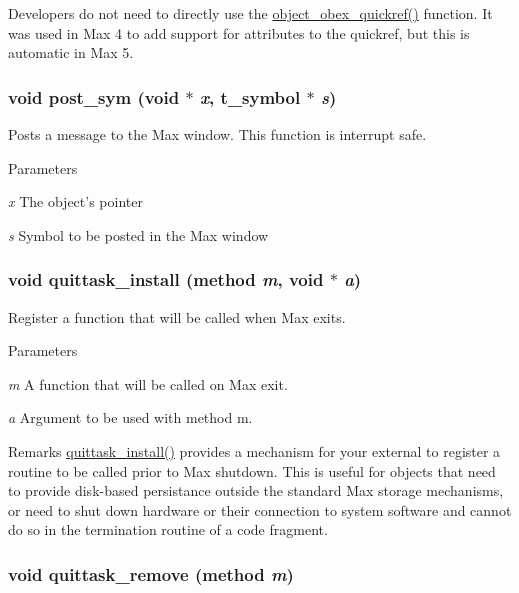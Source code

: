 Developers do not need to directly use the \hyperlink{group__misc_ga332b8831bb1a42503b13d16269fc5ade}{object\_\-obex\_\-quickref()} function. It was used in Max 4 to add support for attributes to the quickref, but this is automatic in Max 5. \hypertarget{group__misc_gad8bf1a07113f7db2b387d5e138fe59fd}{
\subsubsection[{post\_\-sym}]{\setlength{\rightskip}{0pt plus 5cm}void post\_\-sym (void $\ast$ {\em x}, \/  {\bf t\_\-symbol} $\ast$ {\em s})}}
\label{group__misc_gad8bf1a07113f7db2b387d5e138fe59fd}


Posts a message to the Max window. This function is interrupt safe.


\begin{DoxyParams}{Parameters}
\item[{\em x}]The object's pointer \item[{\em s}]Symbol to be posted in the Max window \end{DoxyParams}
\hypertarget{group__misc_ga0638f6ac63b75fa53c0a34db8ec8d412}{
\subsubsection[{quittask\_\-install}]{\setlength{\rightskip}{0pt plus 5cm}void quittask\_\-install ({\bf method} {\em m}, \/  void $\ast$ {\em a})}}
\label{group__misc_ga0638f6ac63b75fa53c0a34db8ec8d412}


Register a function that will be called when Max exits. 
\begin{DoxyParams}{Parameters}
\item[{\em m}]A function that will be called on Max exit. \item[{\em a}]Argument to be used with method m.\end{DoxyParams}
\begin{DoxyRemark}{Remarks}
\hyperlink{group__misc_ga0638f6ac63b75fa53c0a34db8ec8d412}{quittask\_\-install()} provides a mechanism for your external to register a routine to be called prior to Max shutdown. This is useful for objects that need to provide disk-\/based persistance outside the standard Max storage mechanisms, or need to shut down hardware or their connection to system software and cannot do so in the termination routine of a code fragment. 
\end{DoxyRemark}
\hypertarget{group__misc_ga99223860e2a94772b52089abfeb506f3}{
\subsubsection[{quittask\_\-remove}]{\setlength{\rightskip}{0pt plus 5cm}void quittask\_\-remove ({\bf method} {\em m})}}
\label{group__misc_ga99223860e2a94772b52089abfeb506f3}


